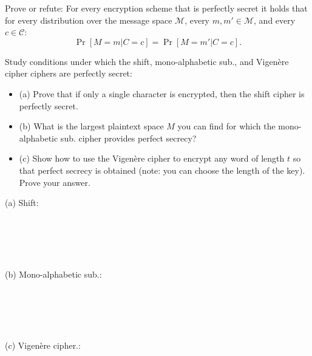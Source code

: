 \documentclass[12pt,letterpaper,boxed]{amspset}
\begin{document}
\begin{problem}[2.1]
Prove or refute: For every encryption scheme that is perfectly secret it holds that for every distribution over the message space $\mathcal{M}$, every $m, m' \in \mathcal{M}$, and every $c \in \mathcal{C}$:
\[ \Pr[M=m | C=c] = \Pr[M=m'|C=c].
\]
\end{problem}

\begin{solution}
\vspace{5cm}

\end{solution}

\begin{problem}[2.2]
Study conditions under which the shift, mono-alphabetic sub., and Vigen\`{e}re cipher ciphers are perfectly secret:
\begin{itemize}
\item (a) Prove that if only a single character is encrypted, then the shift cipher is perfectly secret.
\item (b) What is the largest plaintext space $M$ you can find for which the mono-alphabetic sub. cipher provides perfect secrecy?
\item (c) Show how to use the Vigen\`{e}re cipher to encrypt any word of length $t$ so that perfect secrecy is obtained (note: you can choose the length of the key). Prove your answer.
\end{itemize}
\end{problem}

\begin{solution}
(a) Shift:\\
\\
\\
\\
\\
\\
(b) Mono-alphabetic sub.:\\
\\
\\
\\
\\
\\
(c) Vigen\`{e}re cipher.:\\
\\
\\
\\
\\
\\
\\
\\
\end{solution}
\end{document}
